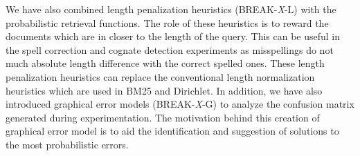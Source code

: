 We have also combined length penalization heuristics (BREAK-\textit{X}-L) with the probabilistic retrieval functions. 
The role of these heuristics is to reward the documents which are in closer to the length of the query.
This can be useful in the spell correction and cognate detection experiments as misspellings do not much absolute length difference with the correct spelled ones.
These length penalization heuristics can replace the conventional length normalization heuristics which are used in BM25 and Dirichlet.
In addition, we have also introduced graphical error models (BREAK-\textit{X}-G) to analyze the confusion matrix generated during experimentation. 
The motivation behind this creation of graphical error model is to aid the identification and suggestion of solutions to the most probabilistic errors.

%
%
%
